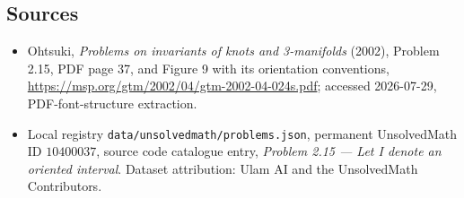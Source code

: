 \documentclass[11pt]{article}
\begin{document}
\subsection{Sources}
\begin{itemize}
\item Ohtsuki, \emph{Problems on invariants of knots and 3-manifolds} (2002), Problem 2.15, PDF page 37, and Figure 9 with its orientation conventions, \url{https://msp.org/gtm/2002/04/gtm-2002-04-024s.pdf}; accessed 2026-07-29, PDF-font-structure extraction.
\item Local registry \texttt{data/unsolvedmath/problems.json}, permanent UnsolvedMath ID $10400037$, source code catalogue entry, \emph{Problem 2.15 --- Let I denote an oriented interval}. Dataset attribution: Ulam AI and the UnsolvedMath Contributors.
\end{itemize}
\end{document}
